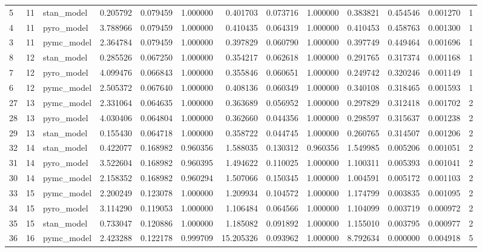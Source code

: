 \begin{tabular}{lrlrrrrrrrrrr}
5 & 11 & stan_model & 0.205792 & 0.079459 & 1.000000 & 0.401703 & 0.073716 & 1.000000 & 0.383821 & 0.454546 & 0.001270 & 1 \\
4 & 11 & pyro_model & 3.788966 & 0.079459 & 1.000000 & 0.410435 & 0.064319 & 1.000000 & 0.410453 & 0.458763 & 0.001300 & 1 \\
3 & 11 & pymc_model & 2.364784 & 0.079459 & 1.000000 & 0.397829 & 0.060790 & 1.000000 & 0.397749 & 0.449464 & 0.001696 & 1 \\
8 & 12 & stan_model & 0.285526 & 0.067250 & 1.000000 & 0.354217 & 0.062618 & 1.000000 & 0.291765 & 0.317374 & 0.001168 & 1 \\
7 & 12 & pyro_model & 4.099476 & 0.066843 & 1.000000 & 0.355846 & 0.060651 & 1.000000 & 0.249742 & 0.320246 & 0.001149 & 1 \\
6 & 12 & pymc_model & 2.505372 & 0.067640 & 1.000000 & 0.408136 & 0.060349 & 1.000000 & 0.340108 & 0.318465 & 0.001593 & 1 \\
27 & 13 & pymc_model & 2.331064 & 0.064635 & 1.000000 & 0.363689 & 0.056952 & 1.000000 & 0.297829 & 0.312418 & 0.001702 & 2 \\
28 & 13 & pyro_model & 4.030406 & 0.064804 & 1.000000 & 0.362660 & 0.044356 & 1.000000 & 0.298597 & 0.315637 & 0.001238 & 2 \\
29 & 13 & stan_model & 0.155430 & 0.064718 & 1.000000 & 0.358722 & 0.044745 & 1.000000 & 0.260765 & 0.314507 & 0.001206 & 2 \\
32 & 14 & stan_model & 0.422077 & 0.168982 & 0.960356 & 1.588035 & 0.130312 & 0.960356 & 1.549985 & 0.005206 & 0.001051 & 2 \\
31 & 14 & pyro_model & 3.522604 & 0.168982 & 0.960395 & 1.494622 & 0.110025 & 1.000000 & 1.100311 & 0.005393 & 0.001041 & 2 \\
30 & 14 & pymc_model & 2.158352 & 0.168982 & 0.960294 & 1.507066 & 0.150345 & 1.000000 & 1.004591 & 0.005172 & 0.001103 & 2 \\
33 & 15 & pymc_model & 2.200249 & 0.123078 & 1.000000 & 1.209934 & 0.104572 & 1.000000 & 1.174799 & 0.003835 & 0.001095 & 2 \\
34 & 15 & pyro_model & 3.114290 & 0.119053 & 1.000000 & 1.106484 & 0.064566 & 1.000000 & 1.104099 & 0.003719 & 0.000972 & 2 \\
35 & 15 & stan_model & 0.733047 & 0.120886 & 1.000000 & 1.185082 & 0.091892 & 1.000000 & 1.155010 & 0.003795 & 0.000977 & 2 \\
36 & 16 & pymc_model & 2.423288 & 0.122178 & 0.999709 & 15.205326 & 0.093962 & 1.000000 & 8.792634 & 0.000000 & 0.004918 & 5 \\

\end{tabular}

